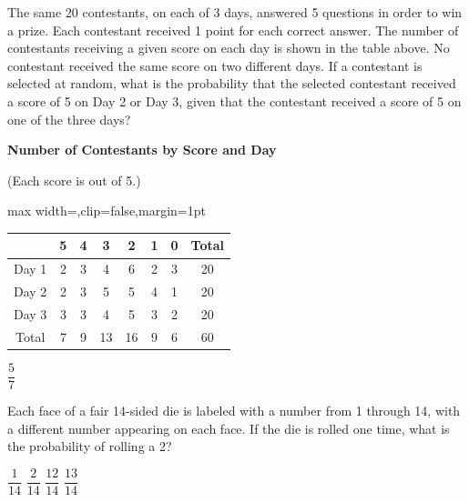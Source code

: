 \question[1]
The same 20 contestants, on each of 3 days, answered 5 questions in order to win a prize. Each contestant received 1 point for each correct answer. The number of contestants receiving a given score on each day is shown in the table above. No contestant received the same score on two different days. If a contestant is selected at random, what is the probability that the selected contestant received a score of 5 on Day 2 or Day 3, given that the contestant received a score of 5 on one of the three days?
\vspace{0.5em}
\begin{center}
  \renewcommand{\arraystretch}{1.3}
  \setlength{\tabcolsep}{0.5em}
  {\textbf{Number of Contestants by Score and Day}\par}
  {\small(Each score is out of 5.)\par}
  \vspace{0.35em}
  \begin{adjustbox}{max width=\linewidth,clip=false,margin=1pt}
  \begin{tabular}{|c|c|c|c|c|c|c|c|}
    \hline
    \cellcolor[HTML]{E0E0E0}\mbox{} &
    \cellcolor[HTML]{E0E0E0}\textbf{5} &
    \cellcolor[HTML]{E0E0E0}\textbf{4} &
    \cellcolor[HTML]{E0E0E0}\textbf{3} &
    \cellcolor[HTML]{E0E0E0}\textbf{2} &
    \cellcolor[HTML]{E0E0E0}\textbf{1} &
    \cellcolor[HTML]{E0E0E0}\textbf{0} &
    \cellcolor[HTML]{E0E0E0}\textbf{Total} \\
    \hline
    Day 1 & 2 & 3 & 4 & 6 & 2 & 3 & 20 \\
    \hline
    Day 2 & 2 & 3 & 5 & 5 & 4 & 1 & 20 \\
    \hline
    Day 3 & 3 & 3 & 4 & 5 & 3 & 2 & 20 \\
    \hline
    Total & 7 & 9 & 13 & 16 & 9 & 6 & 60 \\
    \hline
  \end{tabular}
  \end{adjustbox}
\end{center}
\begin{solutionorbox}[1.25in]
  $\dfrac{5}{7}$
\end{solutionorbox}

\question[1]
Each face of a fair 14-sided die is labeled with a number from 1 through 14, with a different number appearing on each face. If the die is rolled one time, what is the probability of rolling a 2?
\begin{choices}
  \CorrectChoice $\dfrac{1}{14}$
  \choice $\dfrac{2}{14}$
  \choice $\dfrac{12}{14}$
  \choice $\dfrac{13}{14}$
\end{choices}

